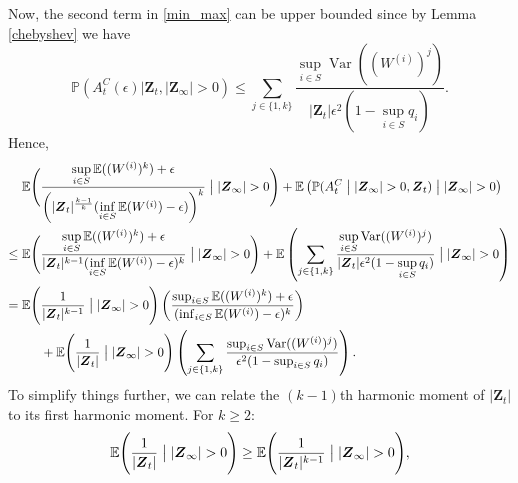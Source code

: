 \documentclass[preprint,3p,12pt]{elsarticle}
\theoremstyle{definition}
\newcommand{\Var}{\operatorname{Var}}
\newcommand{\A}[1][]{A_t^{#1}(\epsilon)}
\begin{document}
Now, the second term in \eqref{min_max} can be upper bounded since by Lemma \ref{chebyshev} we have %
\begin{equation}
    \mathbb{P}(\A[C]|\boldsymbol{Z}_t, |\boldsymbol{Z}_{\infty}| > 0) \le \sum_{j \in \{1,k\}}\frac{\sup_{i \in S}{\Var((W^{(i)})^j)}}{|\boldsymbol{Z}_t| \epsilon^2(1 - \sup_{i \in S}q_i)}.  \label{complement}
\end{equation}
Hence,
    \begin{align}
    \mathbb{E}\Bigg(&\frac{\sup\limits_{i \in S}\mathbb{E}((W^{(i)})^k)+\epsilon}
    {\left(|\boldsymbol{Z}_t|^{\frac{k-1}{k}}(\inf\limits_{i \in S}\mathbb{E}(W^{(i)})-\epsilon)\right)^k}\bigm| |\boldsymbol{Z}_{\infty}| > 0\Bigg)+ 
    \mathbb{E}\left(\mathbb{P}(A^C_t\bigm| |\boldsymbol{Z}_{\infty}| > 0, \boldsymbol{Z}_t)\bigm| |\boldsymbol{Z}_{\infty}| > 0\right) \notag\\
    \le \mathbb{E}\Bigg(&\frac{\sup\limits_{i \in S}\mathbb{E}((W^{(i)})^k)+\epsilon}
    {|\boldsymbol{Z}_t|^{k-1}(\inf\limits_{i \in S}\mathbb{E}(W^{(i)})-\epsilon)^k}\bigm| |\boldsymbol{Z}_{\infty}| > 0\Bigg)
    + \mathbb{E}\left(\sum_{j \in \{1, k\}}\frac{\sup\limits_{i \in S}{\Var((W^{(i)})^j)}}{|\boldsymbol{Z}_t| \epsilon^2(1 - \sup\limits_{i \in S}q_i)}\bigm| |\boldsymbol{Z}_{\infty}| > 0\right) \notag  \\
    = \mathbb{E}\Bigg(&\frac{1}{|\boldsymbol{Z}_t|^{k-1}}\bigm||\boldsymbol{Z}_{\infty}| > 0\Bigg)\left(\frac{\sup_{i \in S}\mathbb{E}((W^{(i)})^k)+\epsilon}
    {(\inf_{i \in S}\mathbb{E}(W^{(i)})-\epsilon)^k}\right) \notag\\
    &+ \mathbb{E}\Bigg(\frac{1}{|\boldsymbol{Z}_t|}\bigm||\boldsymbol{Z}_{\infty}| > 0\Bigg) \left(
    \sum_{j \in \{1,k\}}\frac{\sup_{i \in S}{\Var((W^{(i)})^j)}}{ \epsilon^2(1 - \sup_{i \in S}q_i)}\right).
 \label{last_with_power}
\end{align}
To simplify things further, we can relate the $(k-1)$th harmonic moment of $|\boldsymbol{Z}_t|$ to its first harmonic moment. For $k \geq 2$:
\begin{equation}
    \mathbb{E}\Bigg(\frac{1}{|\boldsymbol{Z}_t|}\bigm||\boldsymbol{Z}_{\infty}| > 0\Bigg) \ge  \mathbb{E}\Bigg(\frac{1}{|\boldsymbol{Z}_t|^{k-1}}\bigm||\boldsymbol{Z}_{\infty}| > 0\Bigg), \label{first_and_kth}
\end{equation}
\end{document}
